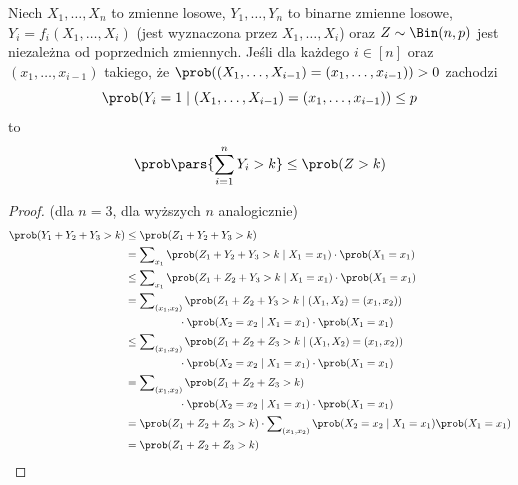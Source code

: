 \begin{lemma}
	\label{binary-random-variable-binomial-upperbound}
	Niech \(X_1, \dots, X_n\) to zmienne losowe, \(Y_1, \dots, Y_n\) to binarne zmienne losowe, \(Y_i = f_i(X_1, \dots, X_i)\) (jest wyznaczona przez \(X_1, \dots, X_i\)) oraz \(Z \sim \Bin(n, p)\) jest niezależna od poprzednich zmiennych. Jeśli dla każdego \(i \in [n]\) oraz \((x_1, \dots, x_{i - 1})\) takiego, że \(\prob((X_1, \dots, X_{i - 1}) = (x_1, \dots, x_{i - 1})) > 0\) zachodzi
	\[
		\prob(Y_i = 1 \mid (X_1, \dots, X_{i - 1}) = (x_1, \dots, x_{i - 1})) \leq p
	\]
	to
	\[
		\prob\pars{\sum_{i = 1}^n Y_i > k} \leq \prob(Z > k)
	\]
\end{lemma}
\begin{proof} (dla \(n = 3\), dla wyższych \(n\) analogicznie)
	\begin{align*}
		\prob(Y_1 + Y_2 + Y_3 > k) & \leq \prob(Z_1 + Y_2 + Y_3 > k)                                                                                \\
		                           & = \sum\nolimits_{x_1} \prob(Z_1 + Y_2 + Y_3 > k \mid X_1 = x_1) \cdot \prob(X_1 = x_1)                         \\
		                           & \leq \sum\nolimits_{x_1} \prob(Z_1 + Z_2 + Y_3 > k \mid X_1 = x_1) \cdot \prob(X_1 = x_1)                      \\
		                           & = \sum\nolimits_{(x_1, x_2)} \prob(Z_1 + Z_2 + Y_3 > k \mid (X_1, X_2) = (x_1, x_2))                           \\
		                           & \qquad\qquad\quad \cdot \prob(X_2 = x_2 \mid X_1 = x_1) \cdot \prob(X_1 = x_1)                                 \\
		                           & \leq \sum\nolimits_{(x_1, x_2)} \prob(Z_1 + Z_2 + Z_3 > k \mid (X_1, X_2) = (x_1, x_2))                        \\
		                           & \qquad\qquad\quad \cdot \prob(X_2 = x_2 \mid X_1 = x_1) \cdot \prob(X_1 = x_1)                                 \\
		                           & = \sum\nolimits_{(x_1, x_2)} \prob(Z_1 + Z_2 + Z_3 > k)                                                        \\
		                           & \qquad\qquad\quad \cdot \prob(X_2 = x_2 \mid X_1 = x_1) \cdot \prob(X_1 = x_1)                                 \\
		                           & = \prob(Z_1 + Z_2 + Z_3 > k) \cdot \sum\nolimits_{(x_1, x_2)} \prob(X_2 = x_2 \mid X_1 = x_1) \prob(X_1 = x_1) \\
		                           & = \prob(Z_1 + Z_2 + Z_3 > k)
	\end{align*}
\end{proof}

